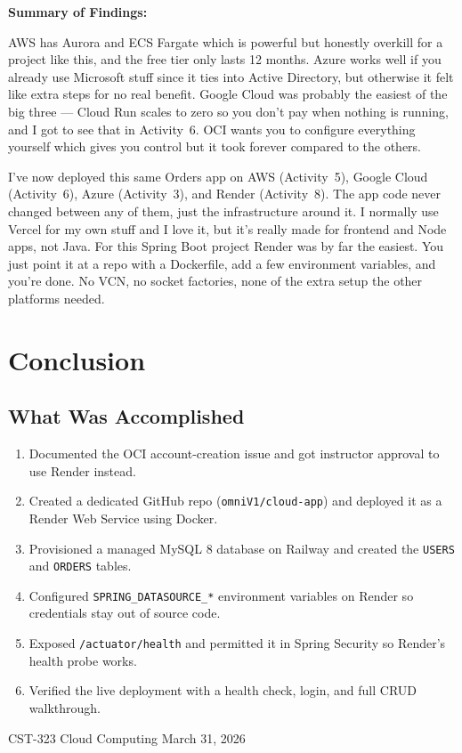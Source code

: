 \documentclass[11pt,letterpaper]{article}
\begin{document}
\textbf{Summary of Findings:}

AWS has Aurora and ECS Fargate which is powerful but honestly overkill for a project like this, and the free tier only lasts 12 months. Azure works well if you already use Microsoft stuff since it ties into Active Directory, but otherwise it felt like extra steps for no real benefit. Google Cloud was probably the easiest of the big three --- Cloud Run scales to zero so you don't pay when nothing is running, and I got to see that in Activity~6. OCI wants you to configure everything yourself which gives you control but it took forever compared to the others.

I've now deployed this same Orders app on AWS (Activity~5), Google Cloud (Activity~6), Azure (Activity~3), and Render (Activity~8). The app code never changed between any of them, just the infrastructure around it. I normally use Vercel for my own stuff and I love it, but it's really made for frontend and Node apps, not Java. For this Spring Boot project Render was by far the easiest. You just point it at a repo with a Dockerfile, add a few environment variables, and you're done. No VCN, no socket factories, none of the extra setup the other platforms needed.

\section{Conclusion}

\subsection{What Was Accomplished}

\begin{enumerate}[nosep]
  \item Documented the OCI account-creation issue and got instructor approval to use Render instead.
  \item Created a dedicated GitHub repo (\texttt{omniV1/cloud-app}) and deployed it as a Render Web Service using Docker.
  \item Provisioned a managed MySQL 8 database on Railway and created the \texttt{USERS} and \texttt{ORDERS} tables.
  \item Configured \texttt{SPRING\_DATASOURCE\_*} environment variables on Render so credentials stay out of source code.
  \item Exposed \texttt{/actuator/health} and permitted it in Spring Security so Render's health probe works.
  \item Verified the live deployment with a health check, login, and full CRUD walkthrough.
\end{enumerate}

\vfill
\begin{center}
\small CST-323 Cloud Computing \textbullet{} March 31, 2026
\end{center}
\end{document}
